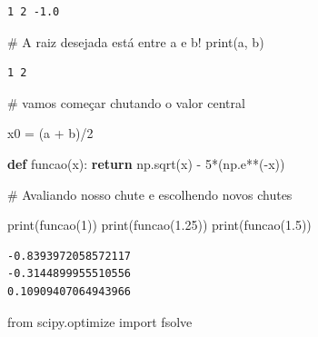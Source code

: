 \documentclass[
  letterpaper,
  DIV=11,
  numbers=noendperiod]{scrreprt}
\newenvironment{Shaded}{\begin{snugshade}}{\end{snugshade}}
\newcommand{\BuiltInTok}[1]{\textcolor[rgb]{0.00,0.23,0.31}{#1}}
\newcommand{\CommentTok}[1]{\textcolor[rgb]{0.37,0.37,0.37}{#1}}
\newcommand{\ControlFlowTok}[1]{\textcolor[rgb]{0.00,0.23,0.31}{\textbf{#1}}}
\newcommand{\DecValTok}[1]{\textcolor[rgb]{0.68,0.00,0.00}{#1}}
\newcommand{\FloatTok}[1]{\textcolor[rgb]{0.68,0.00,0.00}{#1}}
\newcommand{\ImportTok}[1]{\textcolor[rgb]{0.00,0.46,0.62}{#1}}
\newcommand{\KeywordTok}[1]{\textcolor[rgb]{0.00,0.23,0.31}{\textbf{#1}}}
\newcommand{\NormalTok}[1]{\textcolor[rgb]{0.00,0.23,0.31}{#1}}
\newcommand{\OperatorTok}[1]{\textcolor[rgb]{0.37,0.37,0.37}{#1}}
\begin{document}
\begin{verbatim}
1 2 -1.0
\end{verbatim}

\begin{Shaded}
\begin{Highlighting}[]
\CommentTok{\# A raiz desejada está entre a e b!}
\BuiltInTok{print}\NormalTok{(a, b)}
\end{Highlighting}
\end{Shaded}

\begin{verbatim}
1 2
\end{verbatim}

\begin{Shaded}
\begin{Highlighting}[]
\CommentTok{\# vamos começar chutando o valor central}

\NormalTok{x0 }\OperatorTok{=}\NormalTok{ (a }\OperatorTok{+}\NormalTok{ b)}\OperatorTok{/}\DecValTok{2}
\end{Highlighting}
\end{Shaded}

\begin{Shaded}
\begin{Highlighting}[]
\KeywordTok{def}\NormalTok{ funcao(x):}
    \ControlFlowTok{return}\NormalTok{ np.sqrt(x) }\OperatorTok{{-}} \DecValTok{5}\OperatorTok{*}\NormalTok{(np.e}\OperatorTok{**}\NormalTok{(}\OperatorTok{{-}}\NormalTok{x))}
\end{Highlighting}
\end{Shaded}

\begin{Shaded}
\begin{Highlighting}[]
\CommentTok{\# Avaliando nosso chute e escolhendo novos chutes}

\BuiltInTok{print}\NormalTok{(funcao(}\DecValTok{1}\NormalTok{))}
\BuiltInTok{print}\NormalTok{(funcao(}\FloatTok{1.25}\NormalTok{))}
\BuiltInTok{print}\NormalTok{(funcao(}\FloatTok{1.5}\NormalTok{))}
\end{Highlighting}
\end{Shaded}

\begin{verbatim}
-0.8393972058572117
-0.3144899955510556
0.10909407064943966
\end{verbatim}

\begin{Shaded}
\begin{Highlighting}[]
\ImportTok{from}\NormalTok{ scipy.optimize }\ImportTok{import}\NormalTok{ fsolve}
\end{Highlighting}
\end{Shaded}
\end{document}
